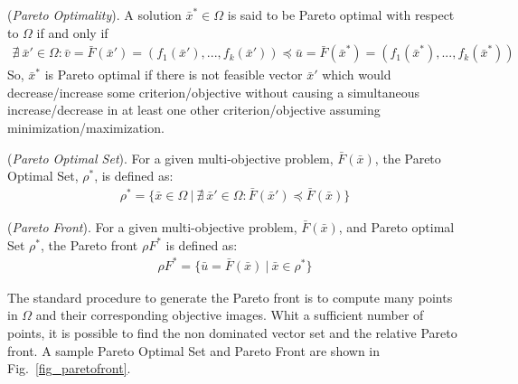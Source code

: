 %
\theoremstyle{definition}
\begin{definition}{(\textit{Pareto Optimality}).}\label{defC3}
A solution $\bar x^\ast \in \Omega$ is said to be Pareto optimal with respect to $\Omega$ if and only if 
%
\begin{equation} \label{equation117}
  \begin{aligned}
    \nexists  \ \bar x' \in \Omega : \bar v = \bar F(\bar x') = ( f_1(\bar x'), . . . , f_k(\bar x')) \preceq \bar u = \bar F(\bar x^\ast) = ( f_1(\bar x^\ast), . . . , f_k(\bar x^\ast))
\end{aligned}
\end{equation}
%
So, $\bar x^\ast$ is Pareto optimal if there is not feasible vector $\bar x'$ which would decrease/increase some criterion/objective without causing a simultaneous increase/decrease in at least one other criterion/objective assuming minimization/maximization.
%
\end{definition}
%
\theoremstyle{definition}
\begin{definition}{(\textit{Pareto Optimal Set}).}\label{defC4}
For a given multi-objective problem, $\bar F(\bar x)$, the Pareto Optimal Set, $\rho^\ast$, is defined as:
%
\begin{equation} \label{equation118}
  \begin{aligned}
    \rho^\ast = \{ \bar x \in \Omega \ | \ \nexists \ \bar x' \in \Omega : \bar F(\bar x') \preceq \bar F(\bar x)\}
\end{aligned}
\end{equation}
%
\end{definition}
%
\theoremstyle{definition}
\begin{definition}{(\textit{Pareto Front}).}\label{defC5}
For a given multi-objective problem, $\bar F(\bar x)$, and Pareto optimal Set $\rho^\ast$, the Pareto front $\rho F^\ast$ is defined as:
%
\begin{equation} \label{equation119}
  \begin{aligned}
    \rho F^\ast = \{ \bar u = \bar F(\bar x) \ | \ \bar x \in \rho^\ast\}
\end{aligned}
\end{equation}
%
\end{definition}
%
The standard procedure to generate the Pareto front is to compute many points in $\Omega$ and their corresponding objective images. Whit a sufficient number of points, it is possible to find the non dominated vector set and the relative Pareto front. A sample Pareto Optimal Set and Pareto Front are shown in Fig.~\ref{fig_paretofront}.
